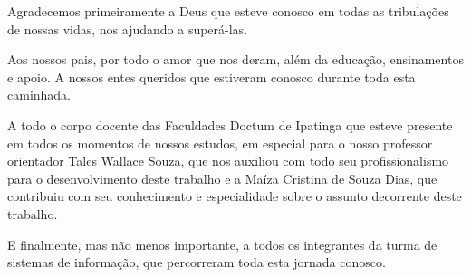 \begin{agradecimentos}[AGRADECIMENTOS]
Agradecemos primeiramente a Deus que esteve conosco em todas as tribulações de nossas vidas, nos ajudando a superá-las.

Aos nossos pais, por todo o amor que nos deram, além da educação, ensinamentos e apoio. A nossos entes queridos que estiveram conosco durante toda esta caminhada.

A todo o corpo docente das Faculdades Doctum de Ipatinga que esteve presente em todos os momentos de nossos estudos, em especial para o nosso professor orientador Tales Wallace Souza, que nos auxiliou com todo seu profissionalismo para o desenvolvimento deste trabalho e a Maíza Cristina de Souza Dias, que contribuiu com seu conhecimento e especialidade sobre o assunto decorrente deste trabalho.

E finalmente, mas não menos importante, a todos os integrantes da turma de sistemas de informação, que percorreram toda esta jornada conosco.
\end{agradecimentos}